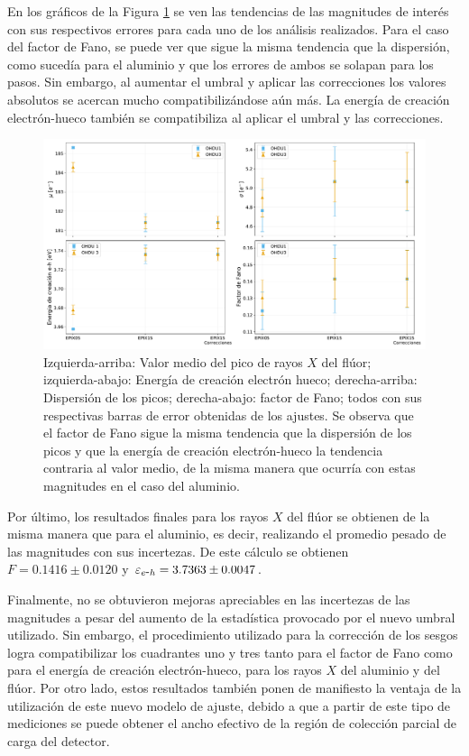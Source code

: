 En los gráficos de la Figura \ref{fig:F_mu_sigma_fano_eh} se ven las tendencias de las magnitudes de interés con sus respectivos errores para cada uno de los análisis realizados. Para el caso del factor de Fano, se puede ver que sigue la misma tendencia que la dispersión, como sucedía para el aluminio y que los errores de ambos se solapan para los pasos. Sin embargo, al aumentar el umbral y aplicar las correcciones los valores absolutos se acercan mucho compatibilizándose aún más. La energía de creación electrón-hueco también se compatibiliza al aplicar el umbral y las correcciones.
\begin{figure}[h]
    \centering
        \includegraphics[scale=0.45]{Figs/F_mu_sigma_fano_Eeh.pdf}
    \caption{Izquierda-arriba: Valor medio del pico de rayos $X$ del flúor; izquierda-abajo: Energía de creación electrón hueco; derecha-arriba: Dispersión de los picos; derecha-abajo: factor de Fano; todos con sus respectivas barras de error obtenidas de los ajustes. Se observa que el factor de Fano sigue la misma tendencia que la dispersión de los picos y que la energía de creación electrón-hueco la tendencia contraria al valor medio, de la misma manera que ocurría con estas magnitudes en el caso del aluminio.}
    \label{fig:F_mu_sigma_fano_eh}
\end{figure}

Por último, los resultados finales para los rayos $X$ del flúor se obtienen de la misma manera que para el aluminio, es decir, realizando el promedio pesado de las magnitudes con sus incertezas. De este cálculo se obtienen $F = 0.1416 \pm 0.0120 $ y $\varepsilon_{e\mbox{-}h} = 3.7363 \pm 0.0047$.

Finalmente, no se obtuvieron mejoras apreciables en las incertezas de las magnitudes a pesar del aumento de la estadística provocado por el nuevo umbral utilizado. Sin embargo, el procedimiento utilizado para la corrección de los sesgos logra compatibilizar los cuadrantes uno y tres tanto para el factor de Fano como para el energía de creación electrón-hueco, para los rayos $X$ del aluminio y del flúor. Por otro lado, estos resultados también ponen de manifiesto la ventaja de la utilización de este nuevo modelo de ajuste, debido a que a partir de este tipo de mediciones se puede obtener el ancho efectivo de la región de colección parcial de carga del detector.

